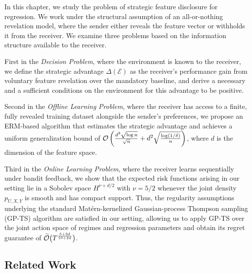 In this chapter, we study the problem of strategic feature disclosure for regression. We work under the structural assumption of an all-or-nothing revelation model, where the sender either reveals the feature vector or withholds it from the receiver. We examine three problems based on the information structure available to the receiver.

First in the \textit{Decision Problem}, where the environment is known to the receiver, we define the strategic advantage $\Delta(\mathcal{E})$ as the receiver's performance gain from voluntary feature revelation over the mandatory baseline, and derive a necessary and a sufficient conditions on the environment for this advantage to be positive.

Second in the \textit{Offline Learning Problem}, where the receiver has access to a finite, fully revealed training dataset alongside the sender's preferences, we propose an ERM-based algorithm that estimates the strategic advantage and achieves a uniform generalization bound of $\mathcal{O}\left(\frac{d^3 \sqrt{\log n}}{\sqrt{n}} + d^2\sqrt{\frac{\log(1/\delta)}{n}}\right)$, where $d$ is the dimension of the feature space.

Third in the \textit{Online Learning Problem}, where the receiver learns sequentially under bandit feedback, we show that the expected risk functions arising in our setting lie in a Sobolev space $H^{\nu+d/2}$ with $\nu=5/2$ whenever the joint density $p_{U,X,Y}$ is smooth and has compact support. Thus, the regularity assumptions underlying the standard Matérn-kernelized Gaussian-process Thompson sampling (GP-TS) algorithm are satisfied in our setting, allowing us to apply GP-TS over the joint action space of regimes and regression parameters and obtain its regret guarantee of $\widetilde{\mathcal{O}}\bigl(T^{\frac{5+3d}{10+2d}}\bigr)$.

\subsection{Related Work}


